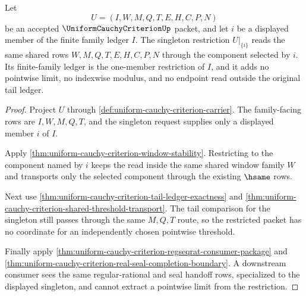 \begin{theorem}
\label{thm:uniform-cauchy-criterion-single-member-restriction-exactness}
Let
$$
U=(I,W,M,Q,T,E,H,C,P,N)
$$
be an accepted $\UniformCauchyCriterionUp$ packet, and let $i$ be a displayed member of the finite family ledger $I$. The singleton restriction $U|_{\{i\}}$ reads the same shared rows $W,M,Q,T,E,H,C,P,N$ through the component selected by $i$. Its finite-family ledger is the one-member restriction of $I$, and it adds no pointwise limit, no indexwise modulus, and no endpoint read outside the original tail ledger.
\end{theorem}
\begin{proof}
Project $U$ through \autoref{def:uniform-cauchy-criterion-carrier}. The family-facing rows are $I,W,M,Q,T$, and the singleton request supplies only a displayed member $i$ of $I$.

Apply \autoref{thm:uniform-cauchy-criterion-window-stability}. Restricting to the component named by $i$ keeps the read inside the same shared window family $W$ and transports only the selected component through the existing $\hsame$ rows.

Next use \autoref{thm:uniform-cauchy-criterion-tail-ledger-exactness} and \autoref{thm:uniform-cauchy-criterion-shared-threshold-transport}. The tail comparison for the singleton still passes through the same $M,Q,T$ route, so the restricted packet has no coordinate for an independently chosen pointwise threshold.

Finally apply \autoref{thm:uniform-cauchy-criterion-regseqrat-consumer-package} and \autoref{thm:uniform-cauchy-criterion-real-seal-completion-boundary}. A downstream consumer sees the same regular-rational and seal handoff rows, specialized to the displayed singleton, and cannot extract a pointwise limit from the restriction.
\end{proof}

